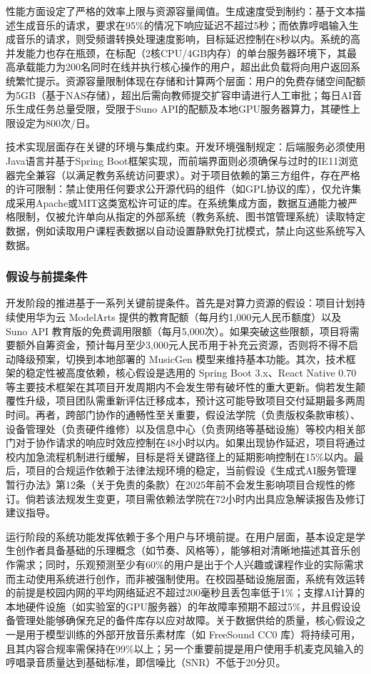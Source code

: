 \documentclass{base}
\begin{document}
性能方面设定了严格的效率上限与资源容量阈值。生成速度受到制约：基于文本描述生成音乐的请求，要求在95\%的情况下响应延迟不超过5秒；而依靠哼唱输入生成音乐的请求，则受频谱转换处理速度影响，目标延迟控制在8秒以内。系统的高并发能力也存在瓶颈，在标配（2核CPU/4GB内存）的单台服务器环境下，其最高承载能力为200名同时在线并执行核心操作的用户，超出此负载将向用户返回系统繁忙提示。资源容量限制体现在存储和计算两个层面：用户的免费存储空间配额为5GB（基于NAS存储），超出后需向教师提交扩容申请进行人工审批；每日AI音乐生成任务总量受限，受限于Suno API的配额及本地GPU服务器算力，其硬性上限设定为800次/日。

技术实现层面存在关键的环境与集成约束。开发环境强制规定：后端服务必须使用Java语言并基于Spring Boot框架实现，而前端界面则必须确保与过时的IE11浏览器完全兼容（以满足教务系统访问要求）。对于项目依赖的第三方组件，存在严格的许可限制：禁止使用任何要求公开源代码的组件（如GPL协议的库），仅允许集成采用Apache或MIT这类宽松许可证的库。在系统集成方面，数据互通能力被严格限制，仅被允许单向从指定的外部系统（教务系统、图书馆管理系统）读取特定数据，例如读取用户课程表数据以自动设置静默免打扰模式，禁止向这些系统写入数据。

\subsubsection{假设与前提条件}

开发阶段的推进基于一系列关键前提条件。​​ 首先是对算力资源的假设：项目计划持续使用华为云 ModelArts 提供的教育配额（每月约1,000元人民币额度）以及 Suno API 教育版的免费调用限额（每月5,000次）。如果突破这些限额，项目将需要额外自筹资金，预计每月至少3,000元人民币用于补充云资源，否则将不得不启动降级预案，切换到本地部署的 MusicGen 模型来维持基本功能。其次，技术框架的稳定性被高度依赖，核心假设是选用的 Spring Boot 3.x、React Native 0.70 等主要技术框架在其项目开发周期内不会发生带有破坏性的重大更新。倘若发生颠覆性升级，项目团队需重新评估迁移成本，预计这可能导致项目交付延期最多两周时间。再者，跨部门协作的通畅性至关重要，假设法学院（负责版权条款审核）、设备管理处（负责硬件维修）以及信息中心（负责网络等基础设施）等校内相关部门对于协作请求的响应时效应控制在48小时以内。如果出现协作延迟，项目将通过校内加急流程机制进行缓解，目标是将关键路径上的延期影响控制在15\%以内。最后，项目的合规运作依赖于法律法规环境的稳定，当前假设《生成式AI服务管理暂行办法》第12条（关于免责的条款）在2025年前不会发生影响项目合规性的修订。倘若该法规发生变更，项目需依赖法学院在72小时内出具应急解读报告及修订建议指导。

​​运行阶段的系统功能发挥依赖于多个用户与环境前提。​​ 在用户层面，基本设定是学生创作者具备基础的乐理概念（如节奏、风格等），能够相对清晰地描述其音乐创作需求；同时，乐观预测至少有60\%的用户是出于个人兴趣或课程作业的实际需求而主动使用系统进行创作，而非被强制使用。在校园基础设施层面，系统有效运转的前提是校园内网的平均网络延迟不超过200毫秒且丢包率低于1\%；支撑AI计算的本地硬件设施（如实验室的GPU服务器）的年故障率预期不超过5\%，并且假设设备管理处能够确保充足的备件库存以应对故障。关于数据供给的质量，核心假设之一是用于模型训练的外部开放音乐素材库（如 FreeSound CC0 库）将持续可用，且其内容合规率需保持在99\%以上；另一个重要前提是用户使用手机麦克风输入的哼唱录音质量达到基础标准，即信噪比（SNR）不低于20分贝。
\end{document}

